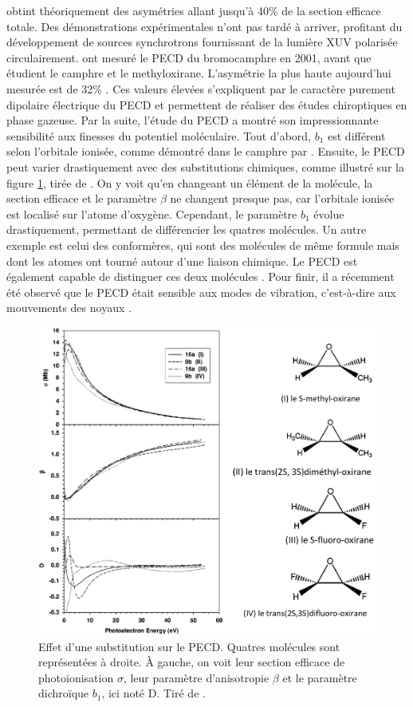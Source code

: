  obtint théoriquement des asymétries allant jusqu'à 40\% de la section efficace totale. Des démonstrations expérimentales n'ont pas tardé à arriver, profitant du développement de sources synchrotrons fournissant de la lumière XUV polarisée circulairement.  ont mesuré le PECD du bromocamphre en 2001, avant que  étudient le camphre et  le methyloxirane. L'asymétrie la plus haute aujourd'hui mesurée est de 32\% . Ces valeurs élevées s'expliquent par le caractère purement dipolaire électrique du PECD et permettent de réaliser des études chiroptiques en phase gazeuse.
Par la suite, l'étude du PECD a montré son impressionnante sensibilité aux finesses du potentiel moléculaire. Tout d'abord, $b_1$ est différent selon l'orbitale ionisée, comme démontré dans le camphre par . Ensuite, le PECD peut varier drastiquement avec des substitutions chimiques, comme illustré sur la figure \ref{fig:substitution}, tirée de . On y voit qu'en changeant un élément de la molécule, la section efficace et le paramètre $\beta$ ne changent presque pas, car l'orbitale ionisée est localisé sur l'atome d'oxygène. Cependant, le paramètre $b_1$ évolue drastiquement, permettant de différencier les quatres molécules. Un autre exemple est celui des conformères, qui sont des molécules de même formule mais dont les atomes ont tourné autour d'une liaison chimique. Le PECD est également capable de distinguer ces deux molécules . Pour finir, il a récemment été observé que le PECD était sensible aux modes de vibration, c'est-à-dire aux mouvements des noyaux .

\begin{figure}[!ht]
\centering
\includegraphics[width=.7\columnwidth]{Figures/PECD/substitution.png}%
\caption{Effet d'une substitution sur le PECD. Quatres molécules sont représentées à droite. \`A gauche, on voit leur section efficace de photoionisation $\sigma$, leur paramètre d'anisotropie $\beta$ et le paramètre dichroïque $b_1$, ici noté D. Tiré de .}
\label{fig:substitution}
\end{figure}

